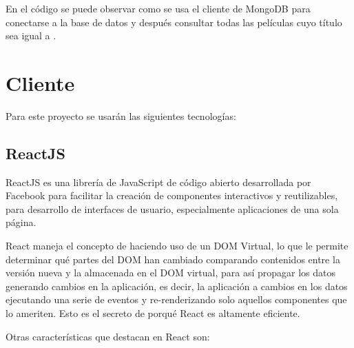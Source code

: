 En el código se puede observar como se usa el cliente de MongoDB para conectarse a la base de datos  y después consultar todas las películas cuyo título sea igual a .

\section{Cliente}

Para este proyecto se usarán las siguientes tecnologías:

\subsection{ReactJS}

ReactJS es una librería de JavaScript de código abierto desarrollada por Facebook para facilitar la creación de componentes interactivos y reutilizables, para desarrollo de interfaces de usuario, especialmente aplicaciones de una sola página.

React maneja el concepto de  haciendo uso de un DOM Virtual, lo que le permite determinar qué partes del DOM han cambiado comparando contenidos entre la versión nueva y la almacenada en el DOM virtual, para así propagar los datos generando cambios en la aplicación, es decir, la aplicación  a cambios en los datos ejecutando una serie de eventos y re-renderizando solo aquellos componentes que lo ameriten. Esto es el secreto de porqué React es altamente eficiente.

Otras características que destacan en React son:

